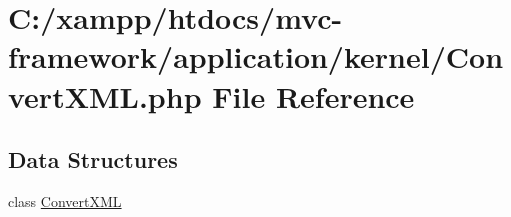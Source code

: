 \hypertarget{_convert_x_m_l_8php}{}\section{C\+:/xampp/htdocs/mvc-\/framework/application/kernel/\+Convert\+X\+M\+L.php File Reference}
\label{_convert_x_m_l_8php}
\subsection*{Data Structures}
\begin{DoxyCompactItemize}
\item 
class \hyperlink{class_convert_x_m_l}{Convert\+X\+M\+L}
\end{DoxyCompactItemize}
